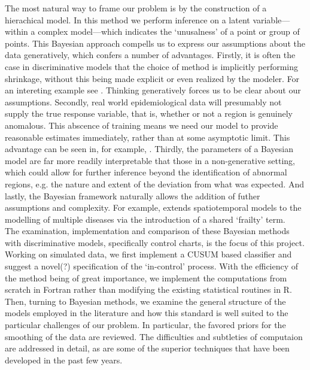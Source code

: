 \documentclass[11pt]{report}
\begin{document}
The most natural way to frame our problem is by the construction of a hierachical model. In this method we perform inference on a latent variable---within a complex model---which indicates the `unusalness' of a point or group of points. This Bayesian approach compells us to express our assumptions about the data generatively, which confers a number of advantages. Firstly, it is often the case in discriminative models that the choice of method is implicitly performing shrinkage, without this being made explicit or even realized by the modeler. For an intereting example see \citet{stoch}. Thinking generatively forces us to be clear about our assumptions. Secondly, real world epidemiological data will presumably not supply the true response variable, that is, whether or not a region is genuinely anomalous. This abscence of training means we need our model to provide reasonable estimates immediately, rather than at some asymptotic limit. This advantage can be seen in, for example, \citet{ng}. Thirdly, the parameters of a Bayesian model are far more readily interpretable that those in a non-generative setting, which could allow for further inference beyond the identification of abnormal regions, e.g. the nature and extent of the deviation from what was expected. And lastly,
 the Bayesian framework naturally allows the addition of futher assumptions and complexity. For example, \citet{banerjee} extends spatiotemporal models to the modelling of multiple diseases via the introduction of a shared `frailty' term. \\

The examination, implementation and comparison of these Bayesian methods with discriminative models, specifically control charts, is the focus of this project. \\

Working on simulated data, we first implement a CUSUM based classifier and suggest a novel(?) specification of the `in-control' process. With the efficiency of the method being of great importance, we implement the computations from scratch in Fortran rather than modifying the existing statistical routines in R. \\

Then, turning to Bayesian methods, we examine the general structure of the models employed in the literature and how this standard is well suited to the particular challenges of our problem. In particular, the favored priors for the smoothing of the data are reviewed. The difficulties and subtleties of computaion are addressed in detail, as are some of the superior techniques that have been developed in the past few years. \\
\end{document}
